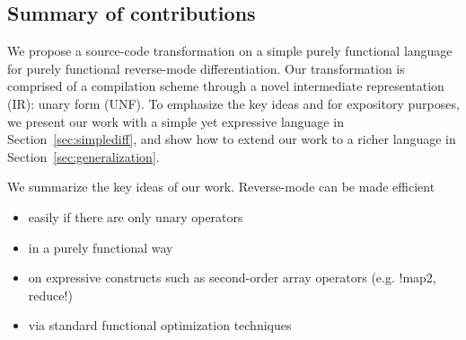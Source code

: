 
\subsection{Summary of contributions}

We propose a source-code transformation on a simple purely functional language for purely functional reverse-mode differentiation.
Our transformation is comprised of a compilation scheme through a novel intermediate representation (IR): unary form (UNF).
To emphasize the key ideas and for expository purposes, we present our work with a simple yet expressive language in Section~\ref{sec:simplediff}, 
and show how to extend our work to a richer language in Section~\ref{sec:generalization}.

We summarize the key ideas of our work. Reverse-mode can be made efficient
\begin{itemize}
   \item easily if there are only unary operators
   \item in a purely functional way
   \item on expressive constructs such as second-order array operators (e.g. !map2, reduce!) 
   \item via standard functional optimization techniques
\end{itemize}

